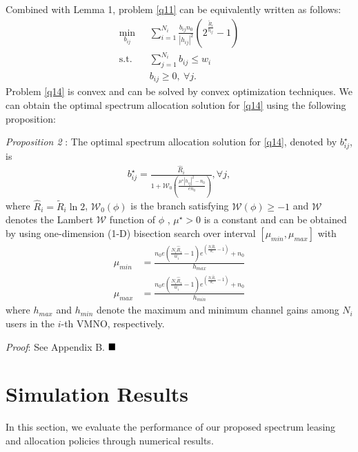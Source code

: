 \documentclass[journal]{IEEEtran}
\begin{document}
Combined with Lemma 1, problem \eqref{q11} can be equivalently written as follows:
\begin{subequations}\label{q14}
	\begin{align}
	\min_{b_{ij}}\ & \sum\limits_{i = 1}^{N_i} \frac{b_{ij}n_0}{\left|h_{ij}\right|^2}\left(2^{\frac{\tilde{R}_i}{b_{ij}}} - 1\right) \label{q14a} \\ \mbox{s.t.} \quad &  \sum\limits_{j = 1}^{N_i} b_{ij} \leq w_i \label{q14b} \\
	& b_{ij} \geq 0, \ \forall j. \label{q14c}
	\end{align}
\end{subequations}
Problem \eqref{q14} is convex and can be solved by convex optimization techniques. We can obtain the optimal spectrum allocation solution for \eqref{q14} using the following proposition:

\textit{Proposition 2} : The optimal spectrum allocation solution for \eqref{q14}, denoted by $b_{ij}^\star$, is
\begin{align}
b_{ij}^\star = \frac{\hat{R}_i}{1 + \mathcal{W}_0\left(\frac{\mu^{\star}\left|h_{ij}\right|^2 - n_0}{en_0}\right)}, \forall j,
\end{align}
where $\hat{R}_i = \tilde{R}_i\ln2$, $\mathcal{W}_0\left(\phi\right)$ is the branch satisfying $\mathcal{W}\left(\phi\right) \geq -1$ and $\mathcal{W}$ denotes the Lambert $\mathcal{W}$ function of $\phi$ \cite{RMCorless}, $\mu^{\star} > 0$ is a constant and can be obtained by using one-dimension (1-D) bisection search over interval $\left[\mu_{min}, \mu_{max}\right]$ with
\begin{align}
\mu_{min} &= \frac{n_0e\left(\frac{N_i\hat{R}_i}{w_i} - 1\right)e^{\left(\frac{N_i\hat{R}_i}{w_i} - 1\right)} + n_0}{h_{max}}  \\
\mu_{max} & = \frac{n_0e\left(\frac{N_i\hat{R}_i}{w_i} - 1\right)e^{\left(\frac{N_i\hat{R}_i}{w_i} - 1\right)} + n_0}{h_{min}}
\end{align}
where $h_{max}$ and $h_{min}$ denote the maximum and minimum channel gains among $N_i$ users in the $i$-th VMNO, respectively.

\textit{Proof}: See Appendix B.  $\hfill\blacksquare$
\section{Simulation Results}
In this section, we evaluate the performance of our proposed spectrum leasing and allocation policies through numerical results. 
\end{document}

